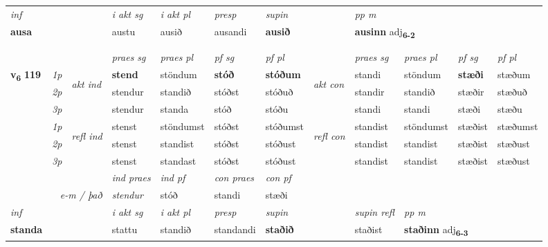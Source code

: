 \begin{longtable}[l]{X>{\footnotesize\itshape}llXXXXlXXXX}
   {\textit{inf}} & &  & \textit{i akt sg} & \textit{i akt pl}   & \textit{presp} & \textit{supin}  && \textit{pp m} \\*
  {\textbf{ausa}} & && austu  & ausið   & ausandi &  \textbf{ausið}  && \multicolumn{2}{l}{\textbf{ausinn} adj\textbf{\textsubscript{6-2}}} \\*

\midrule
 & \\*
  & \\
   \midrule
 & &   & \textit{praes sg}  & \textit{praes pl}    & \textit{ pf sg} & \textit{pf pl} & & \textit{praes sg}  & \textit{praes pl}    & \textit{pf sg} & \textit{pf pl }  \\ \cmidrule{4-7} \cmidrule{9-12}
 \multirow{2}{*}{{{\textbf{v{\textsubscript{6}}} \Large{\textbf{119}}}}}  & 1p & \multirow{3}{*}{\begin{turn}{90}\textit{akt ind}\end{turn}} & \textbf{stend} & stöndum & \textbf{stóð} & \textbf{stóðum} & \multirow{3}{*}{\begin{turn}{90}\textit{akt con}\end{turn}} &standi & stöndum & \textbf{stæði} & stæðum\\*
 & 2p &  &  stendur  & standið & stóðst & stóðuð & & standir & standið & stæðir & stæðuð \\*
 & 3p &  & stendur & standa & stóð & stóðu & & standi & standi& stæði & stæðu \\*
\cmidrule{4-7} \cmidrule{9-12}
 & 1p & \multirow{3}{*}{\begin{turn}{90}\textit{refl ind}\end{turn}}  & stenst & stöndumst & stóðst & stóðumst & \multirow{3}{*}{\begin{turn}{90}\textit{refl con}\end{turn}}  &standist & stöndumst & stæðist & stæðumst \\*
 & 2p &  & stenst & standist & stóðst & stóðust & &standist & standist & stæðist & stæðust \\*
 & 3p  & & stenst & standast & stóðst & stóðust & & standist & standist& stæðist & stæðust \\*
\cmidrule{4-7} \cmidrule{9-12}

   && &  \textit{ind praes} & \textit{ind pf} & \textit{con praes} & \textit{con pf} \\*
\multicolumn{3}{r}{\textit{e-m / það}} & stendur & stóð & standi & stæði \\*

\cmidrule{4-7}
   {\textit{inf}} & &  & \textit{i akt sg} & \textit{i akt pl}   & \textit{presp} & \textit{supin} && \textit{supin refl} & \textit{pp m} \\*
  {\textbf{standa}} & && stattu  & standið   & standandi &  \textbf{staðið} && staðist & \multicolumn{2}{l}{\textbf{staðinn} adj\textbf{\textsubscript{6-3}}} \\*


\end{longtable}
